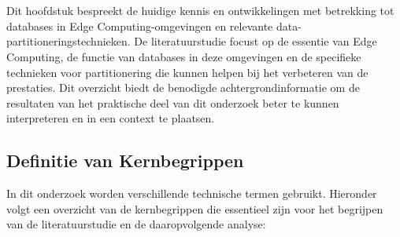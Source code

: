 \chapter{}%
\label{ch:stand-van-zaken}



Dit hoofdstuk bespreekt de huidige kennis en ontwikkelingen met betrekking tot databases in Edge Computing-omgevingen en relevante data-partitioneringstechnieken.
De literatuurstudie focust op de essentie van Edge Computing,
 de functie van databases in deze omgevingen en de specifieke technieken voor partitionering die kunnen helpen bij het verbeteren van de prestaties.
 Dit overzicht biedt de benodigde achtergrondinformatie om de resultaten van het praktische deel van dit onderzoek beter te kunnen interpreteren en in een context te plaatsen.

\section{Definitie van Kernbegrippen}

In dit onderzoek worden verschillende technische termen gebruikt. Hieronder volgt een overzicht van de kernbegrippen die essentieel zijn voor het begrijpen van de literatuurstudie en de daaropvolgende analyse:
 
